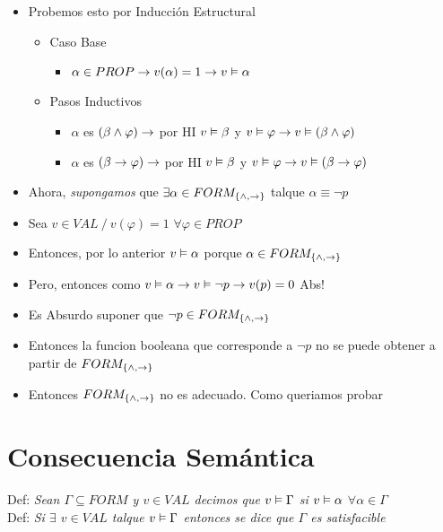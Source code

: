 \documentclass[14pt,a4paper,fleqn]{article}
\begin{document}
\begin{enumerate}
\begin{itemize}
		\item Probemos esto por Inducción Estructural
		\begin{itemize}
			\item Caso Base
			\begin{itemize}
				\item $\alpha \in PROP \rightarrow v(\alpha) = 1 \rightarrow v \vDash \alpha$			
			\end{itemize}
			\item Pasos Inductivos
			\begin{itemize}
				\item $\alpha$ es $(\beta \wedge \varphi) \rightarrow $ por HI $v \vDash \beta $ y $ v \vDash \varphi \rightarrow v \vDash (\beta \wedge \varphi)$
				\item $\alpha$ es $(\beta \rightarrow \varphi) \rightarrow$ por HI $v \vDash \beta $ y $v \vDash \varphi \rightarrow v \vDash (\beta \rightarrow \varphi)$
			\end{itemize}
		\end{itemize}
		\item Ahora, \emph{supongamos} que $\exists \alpha \in FORM_{\{\wedge, \rightarrow\}}$ talque $ \alpha \equiv \neg p$
		\item Sea $v \in VAL \: / \: v(\varphi) = 1$ $\forall \varphi \in PROP$
		\item Entonces, por lo anterior $v \vDash \alpha$ porque $\alpha \in FORM_{\{\wedge, \rightarrow\}}$
		\item Pero, entonces como $ v \vDash \alpha \rightarrow v \vDash \neg p \rightarrow v(p) = 0$ Abs!
		\item Es Absurdo suponer que $\neg p \in FORM_{\{\wedge, \rightarrow\}}$
		\item Entonces la funcion booleana que corresponde a $\neg p$ no se puede obtener a partir de $FORM_{\{\wedge, \rightarrow\}}$ 
		\item Entonces $FORM_{\{\wedge, \rightarrow\}}$ no es adecuado. Como queriamos probar
	\end{itemize}
\end{enumerate}

\section*{Consecuencia Semántica}
Def: \emph{Sean $\Gamma \subseteq FORM $ y $v \in VAL$ decimos que $v \vDash \Gamma$ si $v \vDash \alpha$ $\forall \alpha \in \Gamma $} \\
Def: \emph{Si $\exists$ $v \in VAL$ talque $v \vDash \Gamma$ entonces se dice que $\Gamma$ es satisfacible}
\end{document}
